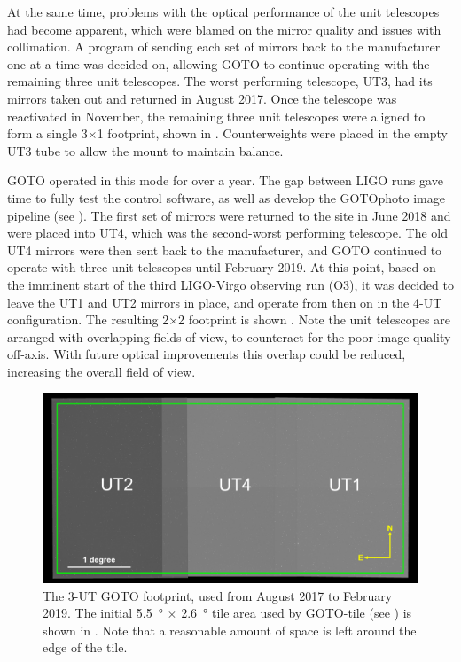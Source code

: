 \begin{colsection}
At the same time, problems with the optical performance of the unit telescopes had become apparent, which were blamed on the mirror quality and issues with collimation. A program of sending each set of mirrors back to the manufacturer one at a time was decided on, allowing GOTO to continue operating with the remaining three unit telescopes. The worst performing telescope, UT3, had its mirrors taken out and returned in August 2017. Once the telescope was reactivated in November, the remaining three unit telescopes were aligned to form a single 3$\times$1 footprint, shown in . Counterweights were placed in the empty UT3 tube to allow the mount to maintain balance.

GOTO operated in this mode for over a year. The gap between LIGO runs gave time to fully test the control software, as well as develop the GOTOphoto image pipeline (see ). The first set of mirrors were returned to the site in June 2018 and were placed into UT4, which was the second-worst performing telescope. The old UT4 mirrors were then sent back to the manufacturer, and GOTO continued to operate with three unit telescopes until February 2019. At this point, based on the imminent start of the third LIGO-Virgo observing run (O3), it was decided to leave the UT1 and UT2 mirrors in place, and operate from then on in the 4-UT configuration. The resulting 2$\times$2 footprint is shown . Note the unit telescopes are arranged with overlapping fields of view, to counteract for the poor image quality off-axis. With future optical improvements this overlap could be reduced, increasing the overall field of view.

\begin{figure}[p]
    \begin{center}
        \includegraphics[width=0.7\linewidth]{images/footprint_1_box.png}
    \end{center}
    \caption[The previous 3-UT GOTO footprint]{
        The 3-UT GOTO footprint, used from August 2017 to February 2019.
        The initial \SI{5.5}{\degree} $\times$ \SI{2.6}{\degree} tile area used by GOTO-tile (see ) is shown in . Note that a reasonable amount of space is left around the edge of the tile.
    }\label{fig:3ut_footprint}
\end{figure}


\end{colsection}
